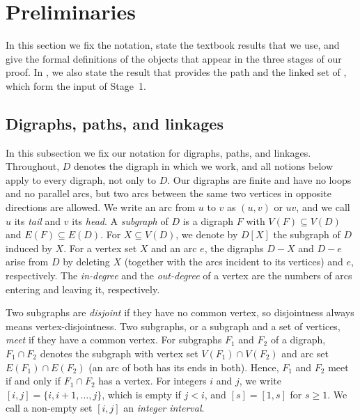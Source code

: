\documentclass[fontsize=12pt,leading=14pt]{fullpaper}
\newcounter{step}
\begin{document}
\FloatBarrier
\flushbottom

%
\section{Preliminaries}\label{sec:prelim}

In this section we fix the notation, state the textbook results that we use, and give the formal definitions of the objects that appear in the three stages of our proof.
In , we also state the result that provides the path and the linked set of , which form the input of Stage~1.

\subsection{Digraphs, paths, and linkages}\label{sec:prelim-digraphs}

In this subsection we fix our notation for digraphs, paths, and linkages.
Throughout, $D$ denotes the digraph in which we work, and all notions below apply to every digraph, not only to $D$.
Our digraphs are finite and have no loops and no parallel arcs, but two arcs between the same two vertices in opposite directions are allowed.
We write an arc from $u$ to $v$ as $(u,v)$ or $uv$, and we call $u$ its \emph{tail} and $v$ its \emph{head}.
A \emph{subgraph} of $D$ is a digraph $F$ with $V(F)\subseteq V(D)$ and $E(F)\subseteq E(D)$.
For $X\subseteq V(D)$, we denote by $D[X]$ the subgraph of $D$ induced by $X$.
For a vertex set $X$ and an arc $e$, the digraphs $D-X$ and $D-e$ arise from $D$ by deleting $X$ (together with the arcs incident to its vertices) and $e$, respectively.
The \emph{in-degree} and the \emph{out-degree} of a vertex are the numbers of arcs entering and leaving it, respectively.

Two subgraphs are \emph{disjoint} if they have no common vertex, so disjointness always means vertex-disjointness.
Two subgraphs, or a subgraph and a set of vertices, \emph{meet} if they have a common vertex.
For subgraphs $F_1$ and $F_2$ of a digraph, $F_1\cap F_2$ denotes the subgraph with vertex set $V(F_1)\cap V(F_2)$ and arc set $E(F_1)\cap E(F_2)$ (an arc of both has its ends in both).
Hence, $F_1$ and $F_2$ meet if and only if $F_1\cap F_2$ has a vertex.
For integers $i$ and $j$, we write $[i,j]=\{i,i+1,\dots,j\}$, which is empty if $j<i$, and $[s]=[1,s]$ for $s\ge1$.
We call a non-empty set $[i,j]$ an \emph{integer interval}.
\end{document}
